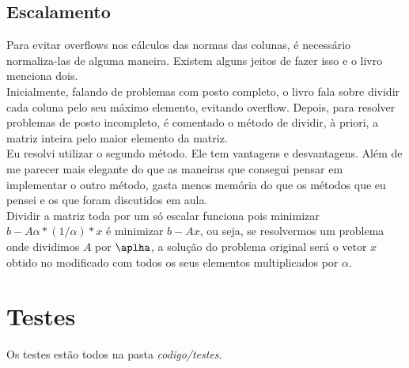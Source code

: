 \documentclass[
10pt, %
a4paper, %
oneside, %
headinclude,footinclude, %
BCOR5mm, %
]{scrartcl}
\begin{document}
\subsection{Escalamento}
Para evitar overflows nos cálculos das normas das colunas, é necessário normaliza-las de alguma maneira. Existem alguns jeitos de fazer isso e o livro menciona dois. \\
Inicialmente, falando de problemas com posto completo, o livro fala sobre dividir cada coluna pelo seu máximo elemento, evitando overflow. Depois, para resolver problemas de posto incompleto, é comentado o método de dividir, à priori, a matriz inteira pelo maior elemento da matriz. \\
Eu resolvi utilizar o segundo método. Ele tem vantagens e desvantagens. Além de me parecer mais elegante do que as maneiras que consegui pensar em implementar o outro método, gasta menos memória do que os métodos que eu pensei e os que foram discutidos em aula. \\
Dividir a matriz toda por um só escalar funciona pois minimizar $b-A\alpha * (1/\alpha) * x$ é minimizar $b-Ax$, ou seja, se resolvermos um problema onde dividimos $A$ por $\aplha$, a solução do problema original será o vetor $x$ obtido no modificado com todos os seus elementos multiplicados por $\alpha$.

\section{Testes}
Os testes estão todos na pasta \textit{codigo/testes}.



\renewcommand{\refname}{\spacedlowsmallcaps{Bibliografia}} %


\end{document}
